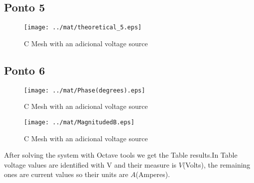 \subsection{Ponto 5}

\begin{figure}[H] \centering
\texttt{[image: ../mat/theoretical\_5.eps]}
\caption{C Mesh with an adicional voltage source} %
\label{fig:mat4}
\end{figure}


\subsection{Ponto 6}

\begin{figure}[H] \centering
\texttt{[image: ../mat/Phase(degrees).eps]}
\caption{C Mesh with an adicional voltage source} %
\label{fig:mat5db}
\end{figure}

\begin{figure}[H] \centering
\texttt{[image: ../mat/MagnitudedB.eps]}
\caption{C Mesh with an adicional voltage source} %
\label{fig:mat5ps}
\end{figure}



After solving the system with Octave tools we get the Table results.In Table voltage values are identified with V and their measure is $V$(Volts), the remaining ones are current values so their units are $A$(Amperes).






